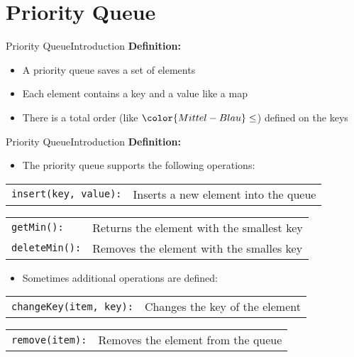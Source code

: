 \section{Priority Queue}


\begin{frame}{Priority Queue}{Introduction}
  \textbf{Definition:}
  \begin{itemize}
    \item
      A priority queue saves a set of elements
    \item
      Each element contains a key and a value like a map
    \item
      There is a total order (like ${\color{Mittel-Blau}\leq}$) defined on the
      keys
  \end{itemize}
\end{frame}


\begin{frame}{Priority Queue}{Introduction}
  \textbf{Definition:}
  \begin{itemize}
    \item
      The priority queue supports the following operations:
  \end{itemize}
  \begin{tabular}{ll}
    {\color{Mittel-Blau}\texttt{insert(key, value):}} &
    Inserts a new element into the queue
  \end{tabular}
  \begin{tabular}{ll}
    {\color{Mittel-Blau}\texttt{getMin():}} &
    Returns the element with the smallest key\\
    {\color{Mittel-Blau}\texttt{deleteMin():}} &
    Removes the element with the smalles key
  \end{tabular}
  \vspace{1.0em}
  \begin{itemize}
    \item
      Sometimes additional operations are defined:
  \end{itemize}
  \begin{tabular}{ll}
    {\color{Mittel-Blau}\texttt{changeKey(item, key):}} &
    Changes the key of the element
  \end{tabular}
  \begin{tabular}{ll}
    {\color{Mittel-Blau}\texttt{remove(item):}} &
    Removes the element from the queue
  \end{tabular}
\end{frame}

